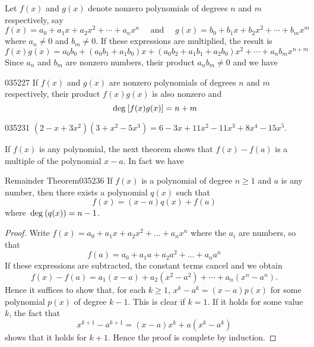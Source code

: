 Let $f(x)$ and $g(x)$ denote nonzero polynomials of degrees $n$ and $m$ respectively, say
\begin{equation*}
f(x) = a_0 + a_1x + a_2x^2 + \cdots + a_nx^n \quad \mbox{ and } \quad g(x) = b_0 + b_1x + b_2x^2 + \cdots + b_mx^m
\end{equation*}
where $a_n \neq 0$ and $b_m \neq 0$. If these expressions are multiplied, the result is
\begin{equation*}
f(x)g(x) = a_0 b_0 + (a_0 b_1 + a_1 b_0)x + (a_0 b_2 + a_1 b_1 + a_2 b_0)x^2  + \cdots + a_nb_m x^{n+m}
\end{equation*}
Since $a_{n}$ and $b_{m}$ are nonzero numbers, their product $a_{n}b_{m} \neq 0$ and we have


\begin{theorem}{}{035227}
If $f(x)$ and $g(x)$ are nonzero polynomials of degrees $n$ and $m$ respectively, their product $f(x)g(x)$ is also nonzero and
\begin{equation*}
\thinspace\operatorname{deg\medspace}[f(x)g(x)] = n+m
\end{equation*}
\end{theorem}

\begin{example}{}{035231}
$ (2-x+3x^2)(3+x^2-5x^3)=6 - 3x+11x^2-11x^3+8x^4-15x^5.$ 
\end{example}

If $f(x)$ is any polynomial, the next theorem shows that $f(x) - f(a)$ is a multiple of the polynomial $x - a$. In fact we have


\begin{theorem}{Remainder Theorem}{035236}
If $f(x)$ is a polynomial of degree $n \geq 1$ and $a$ is any number, then there exists a polynomial $q(x)$ such that
\begin{equation*}
f(x) = (x-a)q(x)+f(a)
\end{equation*}
where $\thinspace\operatorname{deg\medspace}(q(x)) = n - 1$. 
\end{theorem}

\begin{proof}
Write $f(x) = a_{0} + a_{1}x + a_{2}x^{2} + \dots  + a_{n}x^{n}$ where the $a_i$ are numbers, so that 
\begin{equation*}
f(a) = a_{0} + a_{1}a + a_{2}a^{2} + \dots  + a_{n}a^{n}
\end{equation*}
If these expressions are subtracted, the constant terms cancel and we obtain
\begin{equation*}
f(x)-f(a) = a_1(x-a)+a_2(x^2-a^2)+ \cdots + a_n (x^n-a^n).
\end{equation*}
Hence it suffices to show that, for each $k \geq 1$, $x^{k}- a^{k} = (x - a)p(x)$ for some polynomial $p(x)$ of degree $k - 1$. This is clear if $k = 1$. If it holds for some value $k$, the fact that
\begin{equation*}
x^{k+1} - a^{k+1} = (x-a)x^k + a(x^k-a^k)
\end{equation*}
shows that it holds for $k + 1$. Hence the proof is complete by induction.
\end{proof}

